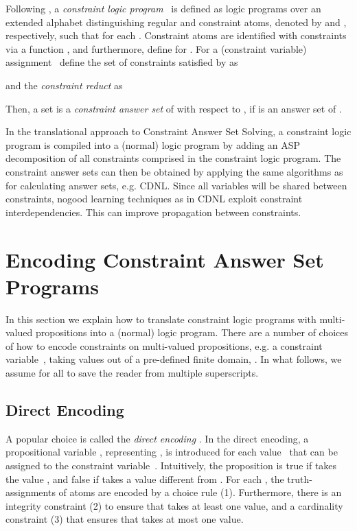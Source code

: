 \documentclass{tlp}
\begin{document}
Following , a \emph{constraint logic program}~ is defined as logic programs over an extended alphabet distinguishing regular and constraint atoms, denoted by  and , respectively, such that  for each .
Constraint atoms are identified with constraints via a function , and furthermore, define  for . For a (constraint variable) assignment~ define the set of constraints satisfied by  as

and the \emph{constraint reduct} as 

Then, a set  is a \emph{constraint answer set} of  with respect to , if  is an answer set of .

In the translational approach to Constraint Answer Set Solving, a constraint logic program is compiled into a (normal) logic program by adding an ASP decomposition of all constraints comprised in the constraint logic program. The constraint answer sets can then be obtained by applying the same algorithms as for calculating answer sets, e.g. CDNL. Since all variables will be shared between constraints, nogood learning techniques as in CDNL exploit constraint interdependencies. This can improve propagation between constraints.

\section{Encoding Constraint Answer Set Programs} \label{sec:enc}

In this section we explain how to translate constraint logic programs with multi-valued propositions into a (normal) logic program. There are a number of choices of how to encode constraints on multi-valued propositions, e.g. a constraint variable~, taking values out of a pre-defined finite domain, . In what follows, we assume  for all  to save the reader from multiple superscripts.


\subsection{Direct Encoding}

A popular choice is called the \emph{direct encoding} \cite{wa00}. In the direct encoding, a propositional variable , representing , is introduced for each value~ that can be assigned to the constraint variable~. Intuitively, the proposition  is true if  takes the value , and false if  takes a value different from . For each , the truth-assignments of atoms  are encoded by a choice rule (1). Furthermore, there is an integrity constraint (2) to ensure that  takes at least one value, and a cardinality constraint (3) that ensures that  takes at most one value.
\end{document}
